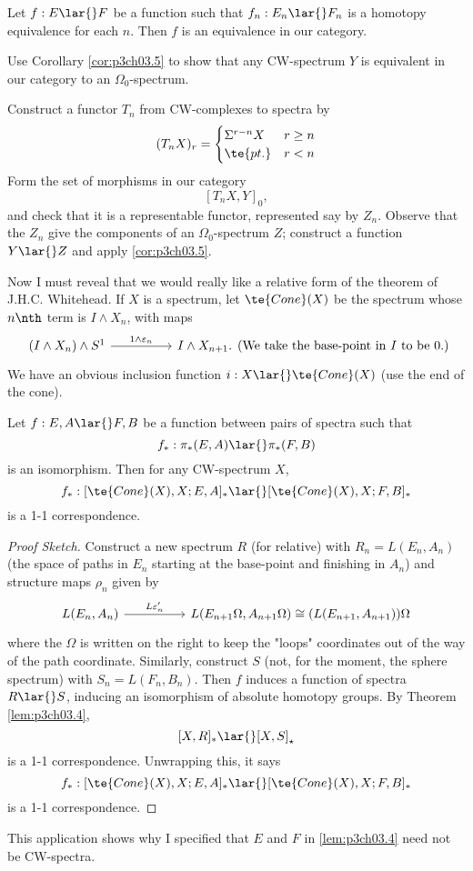 \documentclass[../main]{subfiles}
\begin{document}
\begin{examples}
Let $f: E\lar{} F$ be a function such that $f_n: E_n\lar{} F_n$ is a
homotopy equivalence for each $n$. Then $f$ is an equivalence in our
category. 
\end{examples}
\begin{exercise}
Use Corollary \ref{cor:p3ch03.5} to show that any CW-spectrum $Y$ is equivalent in our category to an $\Omega_0$-spectrum.
\end{exercise}
\begin{hint}
Construct a functor $T_n$ from CW-complexes to spectra by \[(T_nX)_r =\begin{cases}\Sigma^{r-n}X & r\geq n\\ \te{pt.} & r<n\end{cases}\]
Form the set of morphisms in our category \[[T_nX,Y]_0,\] and check that it is a representable functor, represented say by $Z_n$. Observe that the $Z_n$ give the components of an $\Omega_0$-spectrum $Z$; construct a function $Y\lar{}Z$ and apply \ref{cor:p3ch03.5}.
\end{hint}

Now I must reveal that we would really like a relative form of the
theorem of J.H.C. Whitehead. If $X$ is a spectrum, let $\te{Cone}(X)$ be
the spectrum whose $n\nth$ term is $I\wedge X_n$, with maps
\[\begin{tikzcd}
(I\wedge X_n)\wedge S^1 \arrow[rr, "1\wedge \varepsilon_n"] &  & I\wedge X_{n+1}. 
\end{tikzcd} \text{(We take the base-point in $I$ to be 0.)}\] 
We have an obvious inclusion function $i:X\lar{} \te{Cone}(X)$ (use the end of the cone).
\begin{customthm}{3.6}\label{thm:p3ch03.6}
Let $f:E,A\lar{} F,B$ be a function between pairs of spectra such that \[f_\ast:\pi_\ast(E,A)\lar{} \pi_\ast (F,B)\] is an isomorphism. Then for any CW-spectrum $X$, \[f_\ast:[\te{Cone}(X),X; E,A]_\ast \lar{}[\te{Cone}(X),X; F,B]_\ast\]
is a 1-1 correspondence.
\end{customthm}
\begin{proof}[Proof Sketch]
Construct a new spectrum $R$ (for relative) with $R_n=L(E_n,A_n)$ (the space of paths in $E_n$ starting at the base-point and finishing in $A_n$) and structure maps $\rho_n$ given by 
\[\begin{tikzcd}
{L(E_n,A_n)} \arrow[rr, "L\varepsilon'_n"] &  & {L(E_{n+1} \Omega, A_{n+1} \Omega)\cong (L(E_{n+1},A_{n+1}))\Omega}
\end{tikzcd}  \]
where the $\Omega$ is written on the right to keep the "loops" coordinates out of the way of the path coordinate. Similarly, construct $S$ (not, for the moment, the sphere spectrum) with $S_n=L(F_n,B_n)$. Then $f$ induces a function of spectra $R\lar{} S$, inducing an isomorphism of absolute homotopy groups. By Theorem \ref{lem:p3ch03.4}, 
\[[X,R]_\ast \lar{} [X,S]_\star \]
is a 1-1 correspondence. Unwrapping this, it says \[f_\ast:[\te{Cone}(X),X; E,A]_\ast \lar{}[\te{Cone}(X),X; F,B]_\ast\]
is a 1-1 correspondence.
\end{proof}
This application shows why I specified that $E$ and $F$ in \ref{lem:p3ch03.4} need
not be CW-spectra. 
\end{document}
